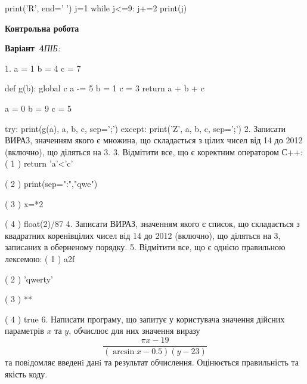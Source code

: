 \documentclass[11pt]{article}
\begin{document}
print('R', end=' ')
j=1
while j<=9:
    j+=2
print(j)

\vspace{5mm}










\newpage

\newpage

{\large\textbf{Контрольна робота}}

\textbf{Варіант \No\,4}\hfill \textit{ПІБ:}\,\underline{\hspace{60mm}}
\vspace{4mm}

1. 
a = 1
b = 4
c = 7

def g(b):
global c    a -= 5
    b = 1
    c = 3
    return a + b + c

a = 0
b = 9
c = 5

try:
    print(g(a), a, b, c, sep=';')
except:
    print('Z', a, b, c, sep=';')
\vspace{5mm}
2. 
Записати ВИРАЗ, значенням якого є множина, що складається з цілих чисел від 14 до 2012 (включно), що діляться на 3.\vspace{5mm}
3. %
Відмітити все, що є коректним оператором С++:
( 1 ) return 'a'<'c'

( 2 ) print(sep=":","qwe")

( 3 ) x=*2

( 4 ) float(2)/87
\vspace{5mm}
4. 
Записати ВИРАЗ, значенням якого є список, що складається з квадратних коренівцілих чисел від 14 до 2012 (включно), що діляться на 3, записаних в оберненому порядку.\vspace{5mm}
5. %
Відмітити все, що є однією правильною лексемою:
( 1 ) a2f

( 2 ) 'qwerty'

( 3 ) **

( 4 ) true
\vspace{5mm}
6. 
Написати програму, що запитує у користувача значення дійсних параметрів $x$ та $y$, обчислює для них значення виразу 
$$\frac{\pi x - 19}{(\arcsin x - 0.5) (y - 23)}$$ 
та повiдомляє введенi данi та результат обчислення.
 Оцінюється правильність та якість коду.
\end{document}
